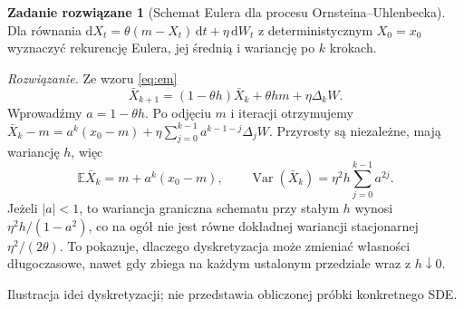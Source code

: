 \documentclass[11pt,a4paper,oneside]{report}
\numberwithin{equation}{chapter}
\theoremstyle{plain}
\theoremstyle{definition}
\newtheorem{zadanie}{Zadanie rozwiązane}[chapter]
\theoremstyle{remark}
\newcommand{\E}{\mathbb{E}}
\newcommand{\Var}{\operatorname{Var}}
\newcommand{\dd}{\mathrm{d}}
\begin{document}
\begin{zadanie}[Schemat Eulera dla procesu Ornsteina--Uhlenbecka]
Dla równania $\dd X_t=\theta(m-X_t)\,\dd t+\eta\,\dd W_t$
z deterministycznym $X_0=x_0$ wyznaczyć rekurencję
Eulera, jej średnią i wariancję po $k$ krokach.

\emph{Rozwiązanie.} Ze wzoru \eqref{eq:em}
\[
\bar X_{k+1}=(1-\theta h)\bar X_k+\theta hm
+\eta\Delta_kW.
\]
Wprowadźmy $a=1-\theta h$. Po odjęciu $m$
i iteracji otrzymujemy
$\bar X_k-m=a^k(x_0-m)+\eta\sum_{j=0}^{k-1}
a^{k-1-j}\Delta_jW$. Przyrosty są niezależne,
mają wariancję $h$, więc
\[
\E\bar X_k=m+a^k(x_0-m),\qquad
\Var(\bar X_k)=\eta^2h\sum_{j=0}^{k-1}a^{2j}.
\]
Jeżeli $|a|<1$, to wariancja graniczna schematu
przy stałym $h$ wynosi $\eta^2h/(1-a^2)$,
co na ogół nie jest równe dokładnej wariancji
stacjonarnej $\eta^2/(2\theta)$.
To pokazuje, dlaczego dyskretyzacja może zmieniać
własności długoczasowe, nawet gdy zbiega na każdym
ustalonym przedziale wraz z $h\downarrow0$.
\end{zadanie}

\begin{center}
\par\smallskip\small Ilustracja idei dyskretyzacji; nie przedstawia obliczonej próbki konkretnego SDE.
\end{center}
\end{document}
